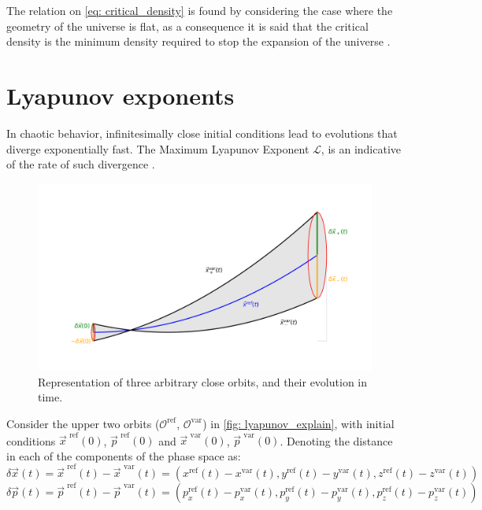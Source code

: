 	The relation on \autoref{eq: critical_density} is found by considering the case where the geometry of the universe is flat, as a consequence it is said that the critical density is the minimum density required to stop the expansion of the universe \cite{binney2011galactic}.
	
\chapter{Lyapunov exponents}
	In chaotic behavior, infinitesimally close initial conditions lead to evolutions that diverge exponentially fast. The Maximum Lyapunov Exponent $\mathcal{L}$, is an indicative of the rate of such divergence \cite{morbidelli2002modern}.
	\begin{figure}[h]
		\centering
		\includegraphics[width = 0.7\linewidth]{"../Files/Week 9/lyapunov_explain"}
		\caption{Representation of three arbitrary close orbits, and their evolution in time.}
		\label{fig: lyapunov_explain}
	\end{figure}
	
	Consider the upper two orbits ($\mathcal{O}^\text{ref}$, $\mathcal{O}^\text{var}$) in \autoref{fig: lyapunov_explain}, with initial conditions $\vec{x}^\text{ ref}(0)$, $\vec{p}^\text{ ref}(0)$ and $\vec{x}^\text{ var}(0)$, $\vec{p}^\text{ var}(0)$. Denoting the distance in each of the components of the phase space as:
	\begin{equation}\label{eq: deltax}
		\delta\vec{x}(t) = \vec{x}^\text{ ref}(t) - \vec{x}^\text{ var}(t) = \left(x^\text{ref}(t) - x^\text{var}(t), y^\text{ref}(t) - y^\text{var}(t), z^\text{ref}(t) - z^\text{var}(t)\right)
	\end{equation}
	\begin{equation}\label{eq: deltap}
		\delta\vec{p}(t) = \vec{p}^\text{ ref}(t) - \vec{p}^\text{ var}(t) = \left(p_x^\text{ref}(t) - p_x^\text{var}(t), p_y^\text{ref}(t) - p_y^\text{var}(t), p_z^\text{ref}(t) - p_z^\text{var}(t)\right)
	\end{equation}
	
